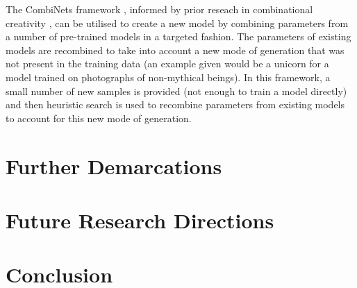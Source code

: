 The CombiNets framework \citep{guzdial2018combinets}, informed by prior reseach in combinational creativity \citep{boden2004creative}, can be utilised to create a new model by combining parameters from a number of pre-trained models in a targeted fashion. 
The parameters of existing models are recombined to take into account a new mode of generation that was not present in the training data (an example given would be a unicorn for a model trained on photographs of non-mythical beings). 
In this framework, a small number of new samples is provided (not enough to train a model directly) and then heuristic search is used to recombine parameters from existing models to account for this new mode of generation.

\section{Further Demarcations}

\section{Future Research Directions}

\section{Conclusion}